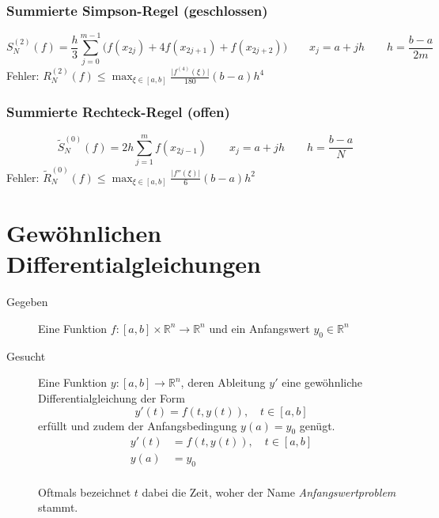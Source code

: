 \documentclass[a4paper, 11pt, accentcolor = tud3b]{tudreport}
\newcommand{\abs}[1]{\ensuremath{{\lvert #1 \rvert}}}
\newcommand{\R}{\ensuremath{\mathbb{R}}}
\begin{document}
	        \subsection{Summierte Simpson-Regel (geschlossen)}
	            \begin{equation*}
		            S_N^{(2)} (f) = \frac{h}{3} \sum_{j=0}^{m-1} \big(f(x_{2j}) + 4 f(x_{2j+1}) + f(x_{2j+2})\big) \qquad x_j = a + jh \qquad h = \frac{b-a}{2m}
	            \end{equation*}
	            Fehler: \( R_N^{(2)} (f) \leq \max_{\xi \in [a, b]} \frac{\abs{f^{(4)}(\xi)}}{180} (b-a)h^4 \)
	
	        \subsection{Summierte Rechteck-Regel (offen)}
	            \begin{equation*}
		            \tilde{S}_N^{(0)} (f) = 2h \sum_{j=1}^{m} f(x_{2j-1}) \qquad x_j = a + jh \qquad h = \frac{b-a}{N}
	            \end{equation*}
	            Fehler: \( \tilde{R}_N^{(0)} (f) \leq \max_{\xi \in [a, b]} \frac{\abs{f''(\xi)}}{6} (b-a)h^2 \)
	
	\chapter{Gewöhnlichen Differentialgleichungen}
		\begin{description}
			\item[Gegeben] Eine Funktion \( f : [a, b] \times \R^n \rightarrow \R^n \) und ein Anfangswert \( y_0 \in \R^n \)
			\item[Gesucht] Eine Funktion \( y : [a, b] \rightarrow \R^n \), deren Ableitung \( y' \) eine gewöhnliche Differentialgleichung der Form \[ y'(t) = f(t, y(t)), \quad t \in [a, b] \] erfüllt und zudem der Anfangsbedingung \( y(a) = y_0 \) genügt.
				\begin{align*}
					y'(t) & = f(t, y(t)), \quad t \in [a, b] \tag{AWP} \\
					y(a)  & = y_0
				\end{align*} \\ Oftmals bezeichnet \(t\) dabei die Zeit, woher der Name \textit{Anfangswertproblem} stammt.
		\end{description}
	
\end{document}
